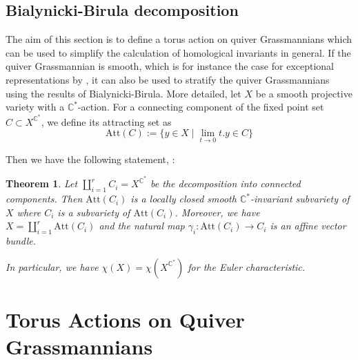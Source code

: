 \documentclass{amsart}
\newtheorem{theorem}{Theorem}[section]
\newcommand{\C}{\mathbb{C}}
\begin{document}
\subsection{Bialynicki-Birula decomposition}
The aim of this section is to define a torus action on quiver Grassmannians which can be used to simplify the calculation of homological invariants in general. If the quiver Grassmannian is smooth, which is for instance the case for exceptional representations by \cite{cr}, it can also be used to stratify the quiver Grassmannians using the results of Bialynicki-Birula. More detailed, let $X$ be a smooth projective variety with a $\C^\ast$-action. For a connecting component of the fixed point set $C\subset X^{\C^\ast}$, we define its attracting set as
\[\mathrm{Att}(C):=\{y\in X\mid \lim_{t\to 0}t.y\in C\}\]

Then we have the following statement, \cite[Section 4]{bb}:
\begin{theorem}Let $\coprod_{i=1}^r C_i= X^{\C^\ast}$ be the decomposition into connected components. Then $\mathrm{Att}(C_i)$ is a locally closed smooth $\C^\ast$-invariant subvariety of $X$ where $C_i$ is a subvariety of $\mathrm{Att}(C_i)$. Moreover, we have $X=\coprod_{i=1}^r\mathrm{Att}(C_i)$ and
the natural map $\gamma_i:\mathrm{Att}(C_i)\to C_i$ is an affine vector bundle. 

In particular, we have $\chi(X)=\chi(X^{\C^\ast})$ for the Euler characteristic.
\end{theorem}


\section{Torus Actions on Quiver Grassmannians}
\noindent 
\end{document}
